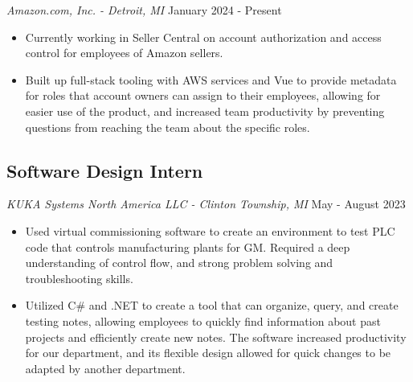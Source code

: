 \documentclass{article}
\begin{document}
\textit{Amazon.com, Inc. - Detroit, MI} \hfill {January 2024 - Present}

\begin{itemize}
	\item Currently working in Seller Central on account authorization and access control for employees of Amazon sellers.
	\item Built up full-stack tooling with AWS services and Vue to provide metadata for roles that account owners can assign to their employees, allowing for easier use of the product, and increased team productivity by preventing questions from reaching the team about the specific roles.
\end{itemize}

\subsection*{Software Design Intern} 

\textit{KUKA Systems North America LLC - Clinton Township, MI} \hfill {May - August 2023}

\begin{itemize}
	\item Used virtual commissioning software to create an environment to test PLC code that controls manufacturing plants for GM. Required a deep understanding of control flow, and strong problem solving and troubleshooting skills.
	\item Utilized C\# and .NET to create a tool that can organize, query, and create testing notes, allowing employees to quickly find information about past projects and efficiently create new notes. The software increased productivity for our department, and its flexible design allowed for quick changes to be adapted by another department.
\end{itemize}




\end{document}
